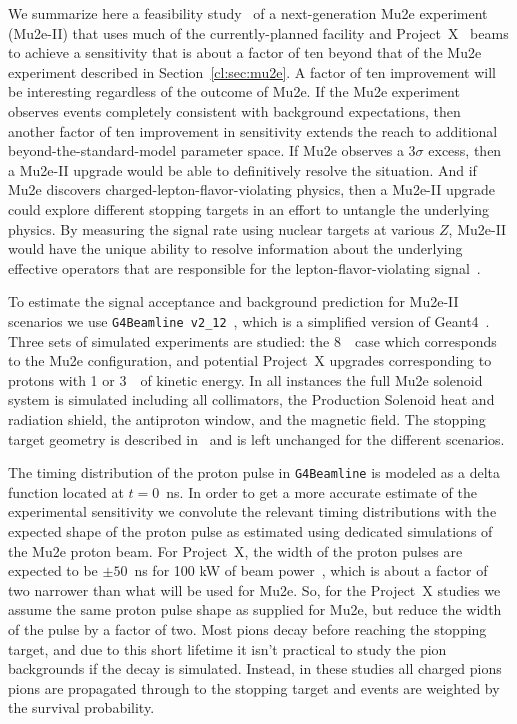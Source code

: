 
%

We summarize here a feasibility study~\cite{Mu2eII} of a
next-generation Mu2e experiment (Mu2e-II) that uses much of the
currently-planned facility and Project~X~\cite{ProjectX} beams to
achieve a sensitivity that is about a factor of ten beyond that of the
Mu2e experiment described in Section~\ref{cl:sec:mu2e}. A factor of
ten improvement will be interesting regardless of the outcome of Mu2e.
If the Mu2e experiment observes events completely consistent with
background expectations, then another factor of ten improvement in
sensitivity extends the reach to additional beyond-the-standard-model
parameter space.  If Mu2e observes a $3\sigma$ excess, then a Mu2e-II
upgrade would be able to definitively resolve the situation.  And if
Mu2e discovers charged-lepton-flavor-violating physics, then a Mu2e-II
upgrade could explore different stopping targets in an effort to
untangle the underlying physics.  By measuring the signal rate using
nuclear targets at various $Z$, Mu2e-II would have the unique ability
to resolve information about the underlying effective operators that
are responsible for the lepton-flavor-violating
signal~\cite{Kitano:2002mt,Cirigliano:2009bz}.



%
To estimate the signal acceptance and background prediction for
Mu2e-II scenarios we use \texttt{G4Beamline v2\_12}~\cite{g4bl}, which
is a simplified version of Geant4~\cite{GEANT4}.  Three sets of
simulated experiments are studied: the 8~\gev\ case which corresponds
to the Mu2e configuration, and potential Project~X upgrades
corresponding to protons with 1 or 3~\gev\ of kinetic energy.  In all
instances the full Mu2e solenoid system is simulated including all
collimators, the Production Solenoid heat and radiation shield, the
antiproton window, and the magnetic field.  The stopping target
geometry is described in~\cite{Abrams:2012er} and is left unchanged for the
different scenarios.
 

The timing distribution of the proton pulse in \texttt{G4Beamline} is
modeled as a delta function located at $t = 0$~ns.  In order to get a
more accurate estimate of the experimental sensitivity we convolute
the relevant timing distributions with the expected shape of the
proton pulse as estimated using dedicated simulations of the Mu2e
proton beam.  For Project~X, the width of the proton pulses are
expected to be $\pm 50$~ns for 100 kW of beam power~\cite{bobT}, which is
about a factor of two narrower than what will be used for Mu2e.  So,
for the Project~X studies we assume the same proton pulse shape as
supplied for Mu2e, but reduce the width of the pulse by a factor of
two.  Most pions decay before reaching the stopping target, and due to
this short lifetime it isn't practical to study the pion backgrounds
if the decay is simulated.  Instead, in these studies all charged
pions pions are propagated through to the stopping target and events
are weighted by the survival probability.
 

